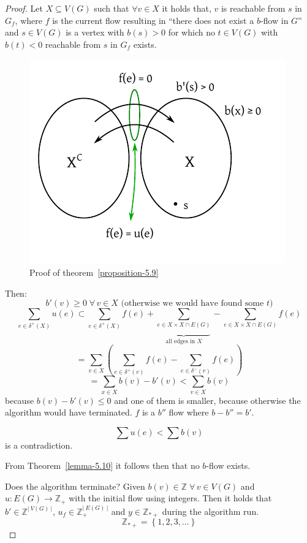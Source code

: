 \documentclass[a4paper]{article}
\theoremstyle{definition}
\newcommand{\card}[1]{\left|\:\!#1\:\!\right|}
\newcommand{\set}[1]{\left\{#1\right\}}
\newcommand{\fall}{\;\forall\,}
\begin{document}
\begin{proof}
  Let $X \subseteq V(G)$ such that $\forall v \in X$ it holds that,
  $v$ is reachable from $s$ in $G_f$,
  where $f$ is the current flow resulting in ``there does not exist a $b$-flow in $G$''
  and $s \in V(G)$ is a vertex with $b(s) > 0$ for which no $t \in V(G)$ with $b(t) < 0$
  reachable from $s$ in $G_f$ exists.

  \begin{figure}[ht]
   \begin{center}
    \includegraphics{img/proposition_5_9_proof.pdf}
    \caption{Proof of theorem~\ref{proposition-5.9}}
   \end{center}
  \end{figure}

  Then:
  \[ b'(v) \geq 0 \fall v \in X \text{ (otherwise we would have found some $t$)} \]
  \[
    \sum_{e \in \delta^+(X)} u(e)
      \subset
        \sum_{e \in \delta^+(X)} f(e)
        + \underbrace{\sum_{e \in X \times{} X \cap E(G)}}_{\text{all edges in } X}
        - \sum_{e \in X \times{} X \cap E(G)} f(e)
  \] \[
    = \sum_{v \in X} \left(\sum_{e \in \delta^+(v)} f(e) - \sum_{e \in \delta^-(v)} f(e) \right)
  \] \[
    = \sum_{x \in X} b(v) - b'(v) < \sum_{v \in X} b(v)
  \]
  because $b(v) - b'(v) \leq 0$ and one of them is smaller, because otherwise the algorithm would have terminated.
  $f$ is a $b''$ flow where $b - b'' = b'$.

  \[ \sum u(e) < \sum b(v) \]
  is a contradiction.

  From Theorem~\ref{lemma-5.10} it follows then that no $b$-flow exists.

  Does the algorithm terminate?
  Given $b(v) \in \mathbb{Z} \fall v \in V(G)$ and $u: E(G) \rightarrow \mathbb{Z}_+$ with the initial flow using integers. Then it holds that $b' \in \mathbb{Z}^{\card{V(G)}}$, $u_f \in \mathbb{Z}_+^{\card{E(G)}}$ and $y \in \mathbb{Z}_{*+}$ during the algorithm run.
  \[ \mathbb{Z}_{*+} = \set{1, 2, 3, \ldots} \]


\end{proof}
\end{document}
